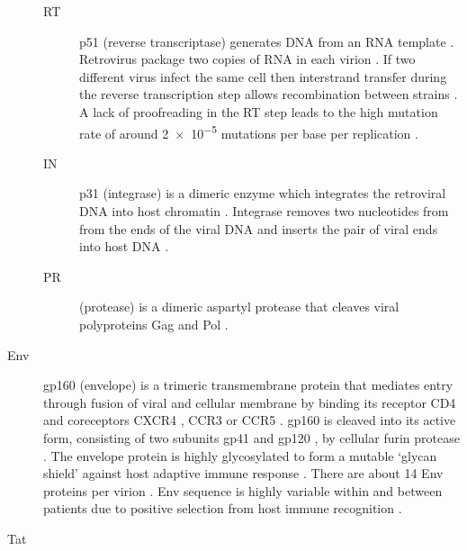 \documentclass[../sherrill-Mix_thesis.tex]{subfiles}
\begin{document}
\begin{description}
			\begin{description}
				\item[RT]
					p51 (reverse transcriptase) \citep{Kohlstaedt1992} generates DNA from an RNA template \citep{Baltimore1970,Temin1970}. Retrovirus package two copies of RNA in each virion \citep{Bellamy1974,Kung1975,Kung1976}. If two different virus infect the same cell then interstrand transfer during the reverse transcription step allows recombination between strains \citep{Panganiban1988,Hu1990,Hu1990a}. A lack of proofreading in the RT step leads to the high mutation rate of around \num{2e-5} mutations per base per replication \citep{Hahn1986,Preston1988,Roberts1988,Mansky1995,Mansky1996,Abram2010,Achuthan2014}.
				\item[IN]
					p31 (integrase) is a dimeric enzyme which integrates the retroviral DNA into host chromatin \citep{Bushman1990,Engelman1991,Panganiban1984,Maertens2010,Hare2010}. Integrase removes two nucleotides from from the \threePrime{} ends of the viral DNA and inserts the pair of viral ends into host DNA \citep{Bushman1991}.
				\item[PR]
					(protease) is a dimeric aspartyl protease \citep{Wlodawer1989} that cleaves viral polyproteins Gag and Pol \citep{Kraeusslich1989,Kohl1988}. 
			\end{description}
		\item[Env]
			gp160 (envelope) is a trimeric transmembrane protein that mediates entry through fusion of viral and cellular membrane by binding its receptor CD4 \citep{Dalgleish1984,Klatzmann1984,Lifson1986,Lifson1986a,Maddon1986} and coreceptors CXCR4 \citep{Feng1996}, CCR3 or CCR5 \citep{Choe1996,He1997}. gp160 is cleaved into its active form, consisting of two subunits gp41 and gp120 \citep{Veronese1985}, by cellular furin protease \citep{Hallenberger1992}. The envelope protein is highly glycosylated to form a mutable `glycan shield' against host adaptive immune response \citep{Wei2003}. There are about 14 Env proteins per virion \citep{Zhu2006}. Env sequence is highly variable within and between patients \citep{Holmes1992,Shankarappa1999} due to positive selection from host immune recognition \citep{Bonhoeffer1995,Wolinsky1996,Ross2002}. %
		\item[Tat]

\end{description}
\end{document}
